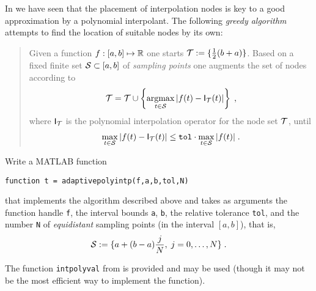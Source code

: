 

\begin{problem}\label{prb:ChebIntp2}

In  we have seen that the placement of
interpolation nodes is key to a good approximation by a polynomial
interpolant. The following \emph{greedy algorithm} attempts to find the location
of suitable nodes by its own:
\begin{quote}
  Given a function $f:[a,b]\mapsto \mathbb{R}$ one starts
  ${\cal T}:=\{\frac{1}{2}(b+a)\}$. Based on a fixed finite set
  ${\cal S}\subset[a,b]$ of \emph{sampling points} one augments the set of nodes
  according to
  \begin{gather}
    \label{rb:1}
    {\cal T} = {\cal T} \cup \left\{\operatorname*{argmax}\limits_{t\in{\cal S}}
    |f(t)-\mathsf{I}_{{\cal T}}(t)|\right\}\;,
  \end{gather}
  where $\mathsf{I}_{{\cal T}}$ is the polynomial interpolation operator for
  the node set ${\cal T}$, until 
  \begin{gather}
    \label{rb:2}
    \operatorname*{max}\limits_{t\in{\cal S}}
   |f(t)-\mathsf{I}_{{\cal T}}(t)| \leq \mathtt{tol}\cdot 
   \operatorname*{max}\limits_{t\in{\cal S}}
    |f(t)|\;.
  \end{gather}
\end{quote}


\begin{subproblem}[3]\label{subprb:ChebIntp2_1}
Write a MATLAB function 
\begin{center}
  \texttt{function t = adaptivepolyintp(f,a,b,tol,N)}
\end{center}
that implements the algorithm described above and takes as arguments the function
handle \texttt{f}, the interval bounds \texttt{a}, \texttt{b}, the
relative tolerance \texttt{tol}, and the number \texttt{N} of 
\emph{equidistant} sampling points (in the interval $[a,b]$), that is,
\begin{gather*}
  {\cal S} := \{a+(b-a)\frac{j}{N},\;j=0,\ldots,N\}\;.
\end{gather*}

\begin{hint}
The function \texttt{intpolyval} from 
is provided and may be used (though it may not be the most efficient way
to implement the function).
\end{hint}


\end{subproblem}
\end{problem}
